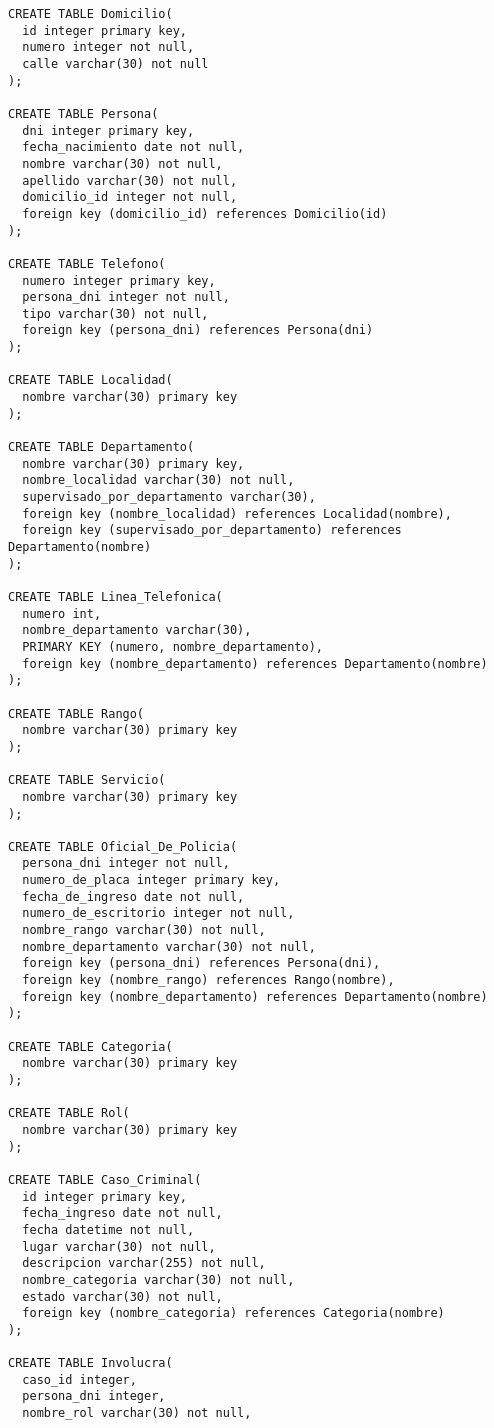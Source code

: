 \documentclass[10pt,a4paper]{article}
\begin{document}
\begin{verbatim}CREATE TABLE Domicilio(
  id integer primary key,
  numero integer not null,
  calle varchar(30) not null 
);

CREATE TABLE Persona(
  dni integer primary key,
  fecha_nacimiento date not null,
  nombre varchar(30) not null,
  apellido varchar(30) not null,
  domicilio_id integer not null,
  foreign key (domicilio_id) references Domicilio(id)
);

CREATE TABLE Telefono(
  numero integer primary key,
  persona_dni integer not null,
  tipo varchar(30) not null,
  foreign key (persona_dni) references Persona(dni)
);

CREATE TABLE Localidad(
  nombre varchar(30) primary key
);

CREATE TABLE Departamento(
  nombre varchar(30) primary key,
  nombre_localidad varchar(30) not null,
  supervisado_por_departamento varchar(30),
  foreign key (nombre_localidad) references Localidad(nombre),
  foreign key (supervisado_por_departamento) references Departamento(nombre)
);

CREATE TABLE Linea_Telefonica(
  numero int,
  nombre_departamento varchar(30),
  PRIMARY KEY (numero, nombre_departamento),
  foreign key (nombre_departamento) references Departamento(nombre)
);

CREATE TABLE Rango(
  nombre varchar(30) primary key
);

CREATE TABLE Servicio(
  nombre varchar(30) primary key
);

CREATE TABLE Oficial_De_Policia(
  persona_dni integer not null,
  numero_de_placa integer primary key,
  fecha_de_ingreso date not null,
  numero_de_escritorio integer not null,
  nombre_rango varchar(30) not null,
  nombre_departamento varchar(30) not null,
  foreign key (persona_dni) references Persona(dni),
  foreign key (nombre_rango) references Rango(nombre),
  foreign key (nombre_departamento) references Departamento(nombre)
);

CREATE TABLE Categoria(
  nombre varchar(30) primary key
);

CREATE TABLE Rol(
  nombre varchar(30) primary key
);

CREATE TABLE Caso_Criminal(
  id integer primary key,
  fecha_ingreso date not null,
  fecha datetime not null,
  lugar varchar(30) not null,
  descripcion varchar(255) not null,
  nombre_categoria varchar(30) not null,
  estado varchar(30) not null,
  foreign key (nombre_categoria) references Categoria(nombre)
);

CREATE TABLE Involucra(
  caso_id integer,
  persona_dni integer,
  nombre_rol varchar(30) not null,


\end{verbatim}
\end{document}

